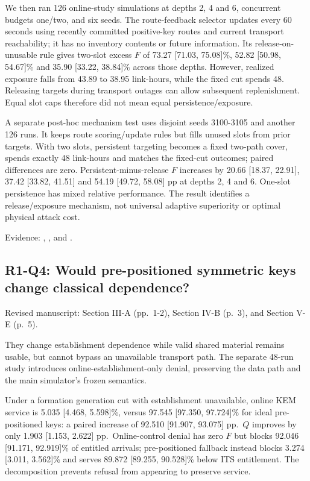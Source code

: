 We then ran 126 online-study simulations at depths 2, 4 and 6, concurrent budgets one/two, and six seeds. The route-feedback selector updates every 60 seconds using recently committed positive-key routes and current transport reachability; it has no inventory contents or future information. Its release-on-unusable rule gives two-slot excess \(F\) of 73.27 {[}71.03, 75.08{]}\%, 52.82 {[}50.98, 54.67{]}\% and 35.90 {[}33.22, 38.84{]}\% across those depths. However, realized exposure falls from 43.89 to 38.95 link-hours, while the fixed cut spends 48. Releasing targets during transport outages can allow subsequent replenishment. Equal slot caps therefore did not mean equal persistence/exposure.

A separate post-hoc mechanism test uses disjoint seeds 3100-3105 and another 126 runs. It keeps route scoring/update rules but fills unused slots from prior targets. With two slots, persistent targeting becomes a fixed two-path cover, spends exactly 48 link-hours and matches the fixed-cut outcomes; paired differences are zero. Persistent-minus-release \(F\) increases by 20.66 {[}18.37, 22.91{]}, 37.42 {[}33.82, 41.51{]} and 54.19 {[}49.72, 58.08{]} pp at depths 2, 4 and 6. One-slot persistence has mixed relative performance. The result identifies a release/exposure mechanism, not universal adaptive superiority or optimal physical attack cost.

Evidence: , , and .

\subsection{R1-Q4: Would pre-positioned symmetric keys change classical dependence?}\label{r1-q4-would-pre-positioned-symmetric-keys-change-classical-dependence}

Revised manuscript: Section III-A (pp.~1-2), Section IV-B (p.~3), and Section V-E (p.~5).

They change establishment dependence while valid shared material remains usable, but cannot bypass an unavailable transport path. The separate 48-run study introduces online-establishment-only denial, preserving the data path and the main simulator's frozen semantics.

Under a formation generation cut with establishment unavailable, online KEM service is 5.035 {[}4.468, 5.598{]}\%, versus 97.545 {[}97.350, 97.724{]}\% for ideal pre-positioned keys: a paired increase of 92.510 {[}91.907, 93.075{]} pp.~\(Q\) improves by only 1.903 {[}1.153, 2.622{]} pp.~Online-control denial has zero \(F\) but blocks 92.046 {[}91.171, 92.919{]}\% of entitled arrivals; pre-positioned fallback instead blocks 3.274 {[}3.011, 3.562{]}\% and serves 89.872 {[}89.255, 90.528{]}\% below ITS entitlement. The decomposition prevents refusal from appearing to preserve service.

